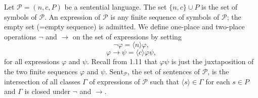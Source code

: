 Let $\mathcal{P} = (n, c, P)$ be a sentential language. The set $\{n, c\} \cup P$ is the set of symbols of $\mathcal{P}$. An expression of $\mathcal{P}$ is any finite sequence of symbols of $\mathcal{P}$; the empty set (=empty sequence) is admitted. We define one-place and two-place operations $\neg$ and $\rightarrow$ on the set of expressions by setting
$$\neg \varphi = \langle n \rangle \varphi,$$
$$\varphi \rightarrow \psi = \langle c \rangle \varphi \psi,$$
for all expressions $\varphi$ and $\psi$. Recall from 1.11 that $\varphi\psi$ is just the juxtaposition of the two finite sequences $\varphi$ and $\psi$. $\text{Sent}_{\mathcal{P}}$, the set of sentences of $\mathcal{P}$, is the intersection of all classes $\Gamma$ of expressions of $\mathcal{P}$ such that $\langle s \rangle \in \Gamma$ for each $s \in P$ and $\Gamma$ is closed under $\neg$ and $\rightarrow$.
